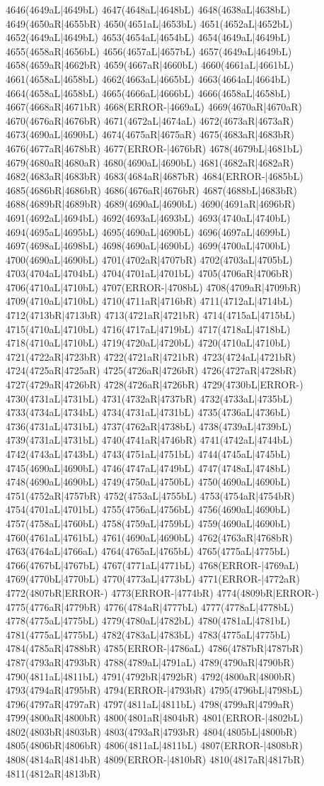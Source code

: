 4646(4649aL|4649bL) 4647(4648aL|4648bL) 4648(4638aL|4638bL) 4649(4650aR|4655bR) 4650(4651aL|4653bL) 4651(4652aL|4652bL) 4652(4649aL|4649bL) 4653(4654aL|4654bL) 4654(4649aL|4649bL) 4655(4658aR|4656bL) 4656(4657aL|4657bL) 4657(4649aL|4649bL) 4658(4659aR|4662bR) 4659(4667aR|4660bL) 4660(4661aL|4661bL) 4661(4658aL|4658bL) 4662(4663aL|4665bL) 4663(4664aL|4664bL) 4664(4658aL|4658bL) 4665(4666aL|4666bL) 4666(4658aL|4658bL) 4667(4668aR|4671bR) 4668(ERROR-|4669aL) 4669(4670aR|4670aR) 4670(4676aR|4676bR) 4671(4672aL|4674aL) 4672(4673aR|4673aR) 4673(4690aL|4690bL) 4674(4675aR|4675aR) 4675(4683aR|4683bR) 4676(4677aR|4678bR) 4677(ERROR-|4676bR) 4678(4679bL|4681bL) 4679(4680aR|4680aR) 4680(4690aL|4690bL) 4681(4682aR|4682aR) 4682(4683aR|4683bR) 4683(4684aR|4687bR) 4684(ERROR-|4685bL) 4685(4686bR|4686bR) 4686(4676aR|4676bR) 4687(4688bL|4683bR) 4688(4689bR|4689bR) 4689(4690aL|4690bL) 4690(4691aR|4696bR) 4691(4692aL|4694bL) 4692(4693aL|4693bL) 4693(4740aL|4740bL) 4694(4695aL|4695bL) 4695(4690aL|4690bL) 4696(4697aL|4699bL) 4697(4698aL|4698bL) 4698(4690aL|4690bL) 4699(4700aL|4700bL) 4700(4690aL|4690bL) 4701(4702aR|4707bR) 4702(4703aL|4705bL) 4703(4704aL|4704bL) 4704(4701aL|4701bL) 4705(4706aR|4706bR) 4706(4710aL|4710bL) 4707(ERROR-|4708bL) 4708(4709aR|4709bR) 4709(4710aL|4710bL) 4710(4711aR|4716bR) 4711(4712aL|4714bL) 4712(4713bR|4713bR) 4713(4721aR|4721bR) 4714(4715aL|4715bL) 4715(4710aL|4710bL) 4716(4717aL|4719bL) 4717(4718aL|4718bL) 4718(4710aL|4710bL) 4719(4720aL|4720bL) 4720(4710aL|4710bL) 4721(4722aR|4723bR) 4722(4721aR|4721bR) 4723(4724aL|4721bR) 4724(4725aR|4725aR) 4725(4726aR|4726bR) 4726(4727aR|4728bR) 4727(4729aR|4726bR) 4728(4726aR|4726bR) 4729(4730bL|ERROR-) 4730(4731aL|4731bL) 4731(4732aR|4737bR) 4732(4733aL|4735bL) 4733(4734aL|4734bL) 4734(4731aL|4731bL) 4735(4736aL|4736bL) 4736(4731aL|4731bL) 4737(4762aR|4738bL) 4738(4739aL|4739bL) 4739(4731aL|4731bL) 4740(4741aR|4746bR) 4741(4742aL|4744bL) 4742(4743aL|4743bL) 4743(4751aL|4751bL) 4744(4745aL|4745bL) 4745(4690aL|4690bL) 4746(4747aL|4749bL) 4747(4748aL|4748bL) 4748(4690aL|4690bL) 4749(4750aL|4750bL) 4750(4690aL|4690bL) 4751(4752aR|4757bR) 4752(4753aL|4755bL) 4753(4754aR|4754bR) 4754(4701aL|4701bL) 4755(4756aL|4756bL) 4756(4690aL|4690bL) 4757(4758aL|4760bL) 4758(4759aL|4759bL) 4759(4690aL|4690bL) 4760(4761aL|4761bL) 4761(4690aL|4690bL) 4762(4763aR|4768bR) 4763(4764aL|4766aL) 4764(4765aL|4765bL) 4765(4775aL|4775bL) 4766(4767bL|4767bL) 4767(4771aL|4771bL) 4768(ERROR-|4769aL) 4769(4770bL|4770bL) 4770(4773aL|4773bL) 4771(ERROR-|4772aR) 4772(4807bR|ERROR-) 4773(ERROR-|4774bR) 4774(4809bR|ERROR-) 4775(4776aR|4779bR) 4776(4784aR|4777bL) 4777(4778aL|4778bL) 4778(4775aL|4775bL) 4779(4780aL|4782bL) 4780(4781aL|4781bL) 4781(4775aL|4775bL) 4782(4783aL|4783bL) 4783(4775aL|4775bL) 4784(4785aR|4788bR) 4785(ERROR-|4786aL) 4786(4787bR|4787bR) 4787(4793aR|4793bR) 4788(4789aL|4791aL) 4789(4790aR|4790bR) 4790(4811aL|4811bL) 4791(4792bR|4792bR) 4792(4800aR|4800bR) 4793(4794aR|4795bR) 4794(ERROR-|4793bR) 4795(4796bL|4798bL) 4796(4797aR|4797aR) 4797(4811aL|4811bL) 4798(4799aR|4799aR) 4799(4800aR|4800bR) 4800(4801aR|4804bR) 4801(ERROR-|4802bL) 4802(4803bR|4803bR) 4803(4793aR|4793bR) 4804(4805bL|4800bR) 4805(4806bR|4806bR) 4806(4811aL|4811bL) 4807(ERROR-|4808bR) 4808(4814aR|4814bR) 4809(ERROR-|4810bR) 4810(4817aR|4817bR) 4811(4812aR|4813bR) 